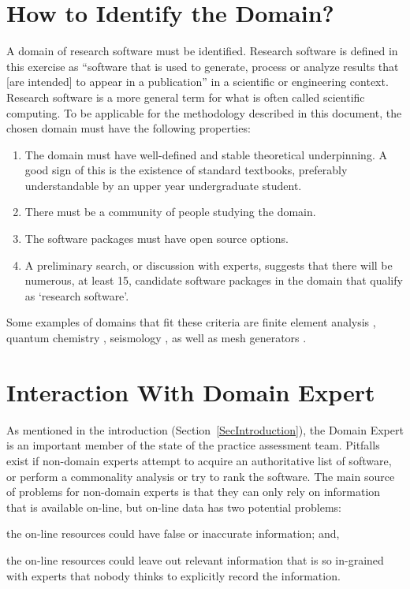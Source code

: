 \documentclass[letterpaper,cleveref]{lipics-v2019}
\begin{document}
\section{How to Identify the Domain?} \label{SecIdentifyDomain} 

A domain of research software must be identified. Research software is defined
in this exercise as ``software that is used to generate, process or analyze
results that [are intended] to appear in a publication'' \citep{hettrick2014uk}
in a scientific or engineering context.  Research software is a more general
term for what is often called scientific computing.  To be applicable for the
methodology described in this document, the chosen domain must have the
following properties:

\begin{enumerate}
\item The domain must have well-defined and stable theoretical underpinning.  A
  good sign of this is the existence of standard textbooks, preferably
  understandable by an upper year undergraduate student.
\item There must be a community of people studying the domain.
\item The software packages must have open source options.
\item A preliminary search, or discussion with experts, suggests that there will
  be numerous, at least 15, candidate software packages in the domain that
  qualify as `research software'.
\end{enumerate}	

Some examples of domains that fit these criteria are finite element analysis
\citep{szabo1996finite}, quantum chemistry \citep{veryazov20042molcas},
seismology \citep{SmithEtAl2018}, as well as mesh generators
\citep{smith2016state}.

\section{Interaction With Domain Expert} \label{SecDomainExpert} 

As mentioned in the introduction (Section~\ref{SecIntroduction}), the Domain
Expert is an important member of the state of the practice assessment team.
Pitfalls exist if non-domain experts attempt to acquire an authoritative list of
software, or perform a commonality analysis or try to rank the software. The
main source of problems for non-domain experts is that they can only rely on
information that is available on-line, but on-line data has two potential
problems:
\begin{inparaenum}[i)]
  \item the on-line resources could have false or inaccurate information; and,
  \item the on-line resources could leave out relevant information that is so
in-grained with experts that nobody thinks to explicitly record the information.
\end{inparaenum}
\end{document}
